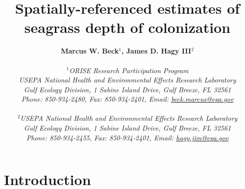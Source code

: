 \documentclass[letterpaper,12pt,oneside]{article}\usepackage[]{graphicx}\usepackage[]{color}
\begin{document}
\raggedbottom
\linenumbers
\raggedright
{}
\setlength{\parindent}{0.5in}
\renewcommand\refname{References \vspace{12pt}}

\begin{singlespace}
\title{{\bf {\Large Spatially-referenced estimates of seagrass depth of colonization}}}
\author{
  {\bf {\normalsize Marcus W. Beck$^1$, James D. Hagy III$^2$}}
  \\\\{\textit {\normalsize $^1$ORISE Research Participation Program}}
  \\{\textit {\normalsize USEPA National Health and Environmental Effects Research Laboratory}}
  \\{\textit {\normalsize Gulf Ecology Division, 1 Sabine Island Drive, Gulf Breeze, FL 32561}}
	\\{\textit {\normalsize Phone: 850-934-2480, Fax: 850-934-2401, Email: \href{mailto:beck.marcus@epa.gov}{beck.marcus@epa.gov}}}
  \\\\{\textit {\normalsize $^2$USEPA National Health and Environmental Effects Research Laboratory}}
	\\{\textit {\normalsize Gulf Ecology Division, 1 Sabine Island Drive, Gulf Breeze, FL 32561}}
	\\{\textit {\normalsize Phone: 850-934-2455, Fax: 850-934-2401, Email: \href{mailto:hagy.jim@epa.gov}{hagy.jim@epa.gov}}}
	}
\date{}
\maketitle
\end{singlespace}
\clearpage

\section{Introduction}
\end{document}
